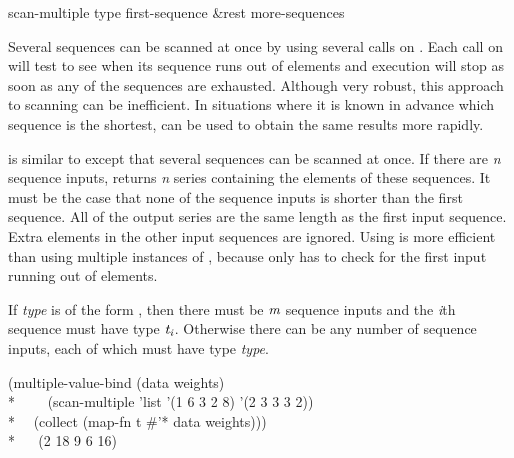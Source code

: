 \begin{defun}[Function]
scan-multiple type first-sequence &rest more-sequences

Several sequences can be scanned at once by using several calls on
.  Each call on  will test to see when its sequence runs
out of elements and execution will stop as soon as any of the sequences are
exhausted.  Although very robust, this approach to scanning can be
inefficient.  In situations where it is known in
advance which sequence is the shortest,  can be used to
obtain the same results more rapidly.
  
 is similar to  except that several sequences
can be scanned at once.  If there are \emph{n} sequence inputs,
 returns \emph{n} series containing the elements of these
sequences.  It must be the case that none of the sequence inputs is shorter
than the first sequence.  All of the output series are the same length as
the first input sequence.  Extra elements in the other input sequences are
ignored.  Using  is more efficient than using multiple
instances of , because  only has to check for
the first input running out of elements.

If \emph{type} is of the form , then
there must be $\emph{m}$ sequence inputs and the \emph{i\/}th sequence must have type
$\emph{t}_{\hbox{\scriptsize\it i}}$.  Otherwise there can be any number of sequence inputs, each of which
must have type \emph{type}.
\begin{lisp}
(multiple-value-bind (data weights) \\*
~~~~(scan-multiple 'list '(1 6 3 2 8) '(2 3 3 3 2)) \\*
~~(collect (map-fn t \#'* data weights))) \\*
~~{\EV} (2 18 9 6 16)
\end{lisp}
\end{defun}

